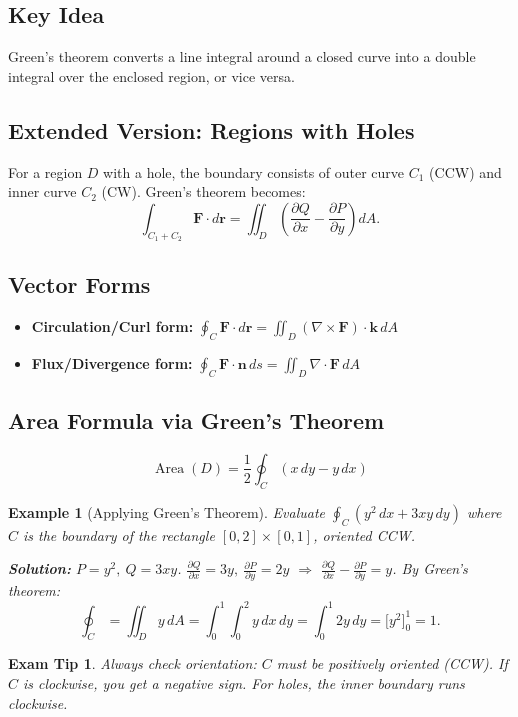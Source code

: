 \documentclass[12pt]{article}
\newcommand{\curl}{\nabla\times}
\newcommand{\divg}{\nabla\cdot}
\newtheorem{example}{Example}[section]
\newtheorem{tip}{Exam Tip}[section]
\begin{document}
\subsection{Key Idea}
Green's theorem converts a line integral around a closed curve into a double integral over the enclosed region, or vice versa.

\subsection{Extended Version: Regions with Holes}
For a region \(D\) with a hole, the boundary consists of outer curve \(C_1\) (CCW) and inner curve \(C_2\) (CW). Green's theorem becomes:
\[
\int_{C_1+C_2} \mathbf{F}\cdot d\mathbf{r} = \iint_D \left(\frac{\partial Q}{\partial x} - \frac{\partial P}{\partial y}\right)dA.
\]

\subsection{Vector Forms}
\begin{itemize}
    \item \textbf{Circulation/Curl form:} \(\oint_C \mathbf{F}\cdot d\mathbf{r} = \iint_D (\curl\mathbf{F})\cdot\mathbf{k}\,dA\)
    \item \textbf{Flux/Divergence form:} \(\oint_C \mathbf{F}\cdot\mathbf{n}\,ds = \iint_D \divg\mathbf{F}\,dA\)
\end{itemize}

\subsection{Area Formula via Green's Theorem}
\[
\operatorname{Area}(D) = \frac12 \oint_C (x\,dy - y\,dx)
\]

\begin{example}[Applying Green's Theorem]
Evaluate \(\oint_C (y^2\,dx + 3xy\,dy)\) where \(C\) is the boundary of the rectangle \([0,2]\times[0,1]\), oriented CCW.

\textbf{Solution:}
\(P=y^2,\ Q=3xy\).  
\(\frac{\partial Q}{\partial x}=3y,\ \frac{\partial P}{\partial y}=2y\) \(\Rightarrow\) \(\frac{\partial Q}{\partial x}-\frac{\partial P}{\partial y}=y\).  
By Green's theorem:
\[
\oint_C = \iint_D y\,dA = \int_0^1\int_0^2 y\,dx\,dy = \int_0^1 2y\,dy = \bigl[y^2\bigr]_0^1 = 1.
\]
\end{example}

\begin{tip}
Always check orientation: \(C\) must be positively oriented (CCW). If \(C\) is clockwise, you get a negative sign. For holes, the inner boundary runs clockwise.
\end{tip}
\end{document}

